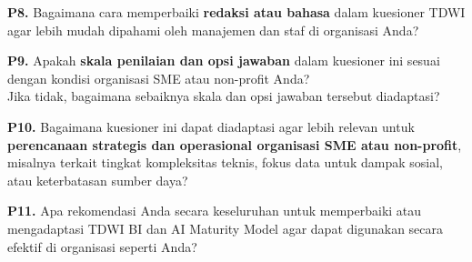 \documentclass{article}
\begin{document}
\vspace{15pt}

\textbf{P8.} Bagaimana cara memperbaiki \textbf{redaksi atau bahasa} dalam kuesioner TDWI agar lebih mudah dipahami oleh manajemen dan staf di organisasi Anda?

\vspace{10pt}
\noindent\framebox[\textwidth][l]{\parbox[t][5cm][t]{\textwidth}{}}

\vspace{15pt}

\textbf{P9.} Apakah \textbf{skala penilaian dan opsi jawaban} dalam kuesioner ini sesuai dengan kondisi organisasi SME atau non-profit Anda?\\
Jika tidak, bagaimana sebaiknya skala dan opsi jawaban tersebut diadaptasi?

\vspace{10pt}
\noindent\framebox[\textwidth][l]{\parbox[t][5cm][t]{\textwidth}{}}

\vspace{15pt}

\textbf{P10.} Bagaimana kuesioner ini dapat diadaptasi agar lebih relevan untuk \textbf{perencanaan strategis dan operasional organisasi SME atau non-profit}, misalnya terkait tingkat kompleksitas teknis, fokus data untuk dampak sosial, atau keterbatasan sumber daya?

\vspace{10pt}
\noindent\framebox[\textwidth][l]{\parbox[t][5cm][t]{\textwidth}{}}

\vspace{15pt}

\textbf{P11.} Apa rekomendasi Anda secara keseluruhan untuk memperbaiki atau mengadaptasi TDWI BI dan AI Maturity Model agar dapat digunakan secara efektif di organisasi seperti Anda?

\vspace{10pt}
\noindent\framebox[\textwidth][l]{\parbox[t][6cm][t]{\textwidth}{}}
\end{document}

